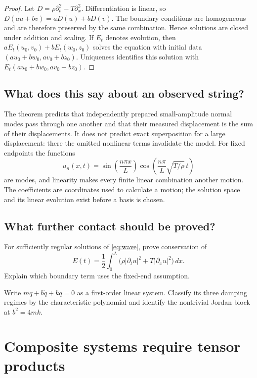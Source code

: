 \begin{proof}
Let $D=\rho\partial_t^2-T\partial_x^2$.  Differentiation is linear, so
$D(au+bv)=aD(u)+bD(v)$.  The boundary conditions are homogeneous and are
therefore preserved by the same combination.  Hence solutions are closed
under addition and scaling.  If $E_t$ denotes evolution, then
$aE_t(u_0,v_0)+bE_t(w_0,z_0)$ solves the equation with initial data
$(au_0+bw_0,av_0+bz_0)$.  Uniqueness identifies this solution with
$E_t(au_0+bw_0,av_0+bz_0)$.
\end{proof}

\section{What does this say about an observed string?}

The theorem predicts that independently prepared small-amplitude normal
modes pass through one another and that their measured displacement is the
sum of their displacements.  It does not predict exact superposition for a
large displacement: there the omitted nonlinear terms invalidate the model.
For fixed endpoints the functions
\[
u_n(x,t)=\sin\!\left(\frac{n\pi x}{L}\right)
\cos\!\left(\frac{n\pi}{L}\sqrt{T/\rho}\,t\right)
\]
are modes, and linearity makes every finite linear combination another
motion.  The coefficients are coordinates used to calculate a motion; the
solution space and its linear evolution exist before a basis is chosen.

\section{What further contact should be proved?}

\begin{exercise}
For sufficiently regular solutions of \eqref{eq:wave}, prove conservation of
\[
E(t)=\frac12\int_0^L\bigl(\rho|\partial_tu|^2
+T|\partial_xu|^2\bigr)\,dx.
\]
Explain which boundary term uses the fixed-end assumption.
\end{exercise}

\begin{exercise}
Write $m\ddot q+b\dot q+kq=0$ as a first-order linear system.  Classify its
three damping regimes by the characteristic polynomial and identify the
nontrivial Jordan block at $b^2=4mk$.
\end{exercise}


\chapter{Composite systems require tensor products}
\label{ch:tensors}

